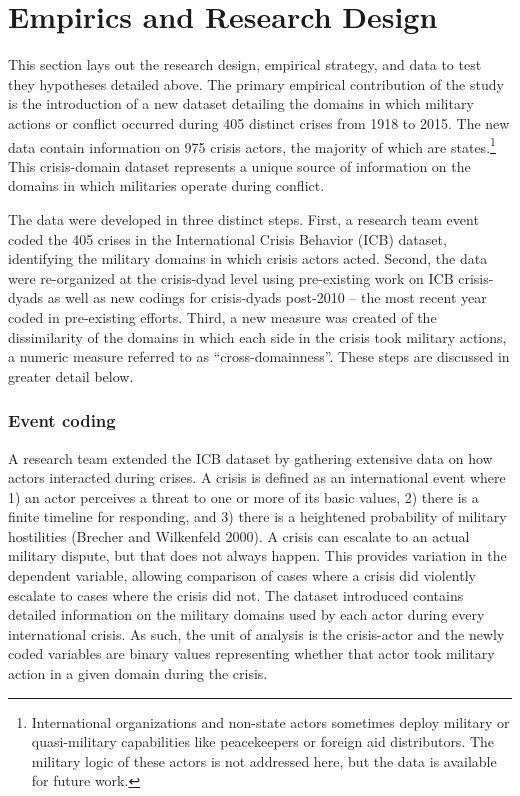\documentclass[
]{article}
\begin{document}
\hypertarget{empirics-and-research-design}{%
\section{Empirics and Research Design}\label{empirics-and-research-design}}

This section lays out the research design, empirical strategy, and data to test they hypotheses detailed above. The primary empirical contribution of the study is the introduction of a new dataset detailing the domains in which military actions or conflict occurred during 405 distinct crises from 1918 to 2015. The new data contain information on 975 crisis actors, the majority of which are states.\footnote{International organizations and non-state actors sometimes deploy military or quasi-military capabilities like peacekeepers or foreign aid distributors. The military logic of these actors is not addressed here, but the data is available for future work.} This crisis-domain dataset represents a unique source of information on the domains in which militaries operate during conflict.

The data were developed in three distinct steps. First, a research team event coded the 405 crises in the International Crisis Behavior (ICB) dataset, identifying the military domains in which crisis actors acted. Second, the data were re-organized at the crisis-dyad level using pre-existing work on ICB crisis-dyads as well as new codings for crisis-dyads post-2010 -- the most recent year coded in pre-existing efforts. Third, a new measure was created of the dissimilarity of the domains in which each side in the crisis took military actions, a numeric measure referred to as ``cross-domainness''. These steps are discussed in greater detail below.

\hypertarget{event-coding}{%
\subsubsection{Event coding}\label{event-coding}}

A research team extended the ICB dataset by gathering extensive data on how actors interacted during crises. A crisis is defined as an international event where 1) an actor perceives a threat to one or more of its basic values, 2) there is a finite timeline for responding, and 3) there is a heightened probability of military hostilities (Brecher and Wilkenfeld 2000). A crisis can escalate to an actual military dispute, but that does not always happen. This provides variation in the dependent variable, allowing comparison of cases where a crisis did violently escalate to cases where the crisis did not. The dataset introduced contains detailed information on the military domains used by each actor during every international crisis. As such, the unit of analysis is the crisis-actor and the newly coded variables are binary values representing whether that actor took military action in a given domain during the crisis.
\end{document}

